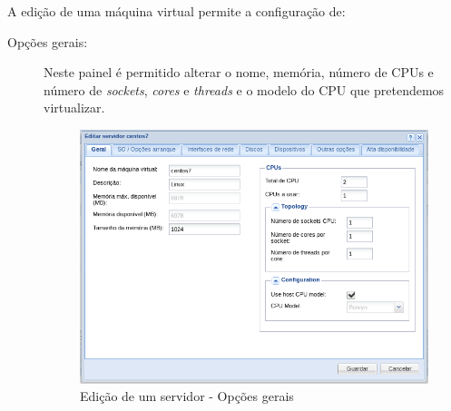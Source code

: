 A edição de uma máquina virtual permite a configuração de:
\begin{description}
	\item[Opções gerais:] Neste painel é permitido alterar o nome, memória, número de CPUs e número de \emph{sockets}, \emph{cores} e \emph{threads} e o modelo do CPU que pretendemos virtualizar.
		\begin{figure}[H]
        		\begin{center}
		        \includegraphics[scale=0.5]{screenshots/server_edit_general.png}
        		\caption{Edição de um servidor - Opções gerais}
	        	\label{fig:server_edit_general}
	        	\end{center}
		\end{figure}


\end{description}
